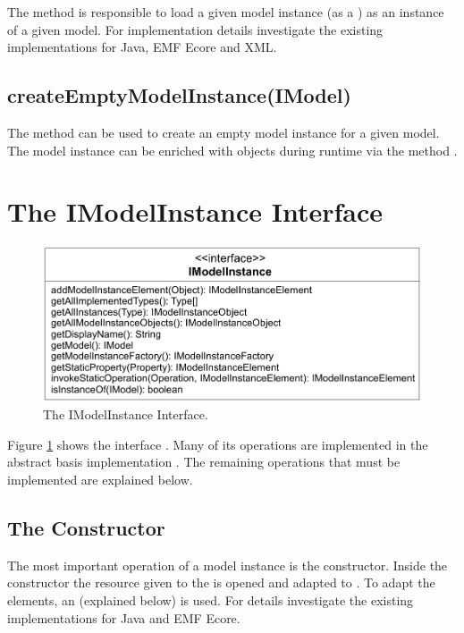 The method  is responsible to load a given 
model instance (as a ) as an instance of a given model. For 
implementation details investigate the existing implementations for Java, 
\acs{EMF} Ecore and \acs{XML}.


\subsection{createEmptyModelInstance(IModel)}

The method  can be used to create an
empty model instance for a given model. The model instance can be enriched with 
objects during runtime via the method 
.



\section{The IModelInstance Interface}

\begin{figure}
	\centering
	\includegraphics[width=0.8\linewidth]{figures/modelInstanceTypeAdaptation/modelInstanceInterface}
	\caption{The IModelInstance Interface.}
	\label{pic:modelInstanceTypeAdaptation:modelInstanceInterface}
\end{figure}

Figure \ref{pic:modelInstanceTypeAdaptation:modelInstanceInterface} shows the 
interface . Many of its operations are implemented in the 
abstract basis implementation . The remaining 
operations that must be implemented are explained below.


\subsection{The Constructor}

The most important operation of a model instance is the constructor. Inside the 
constructor the resource given to the  is opened
and adapted to . To adapt the elements, an 
 (explained below) is used. For details investigate
the existing  implementations for Java and \acs{EMF} Ecore.


